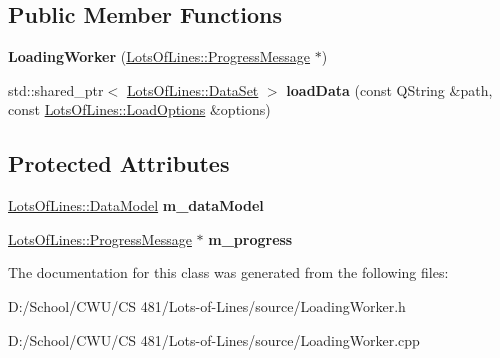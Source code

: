 \subsection*{Public Member Functions}
\begin{DoxyCompactItemize}
\item 
{\bfseries Loading\+Worker} (\hyperlink{class_lots_of_lines_1_1_progress_message}{Lots\+Of\+Lines\+::\+Progress\+Message} $\ast$)\hypertarget{class_loading_worker_a3f5b1820e6770cc3d981360d730cd7dc}{}\label{class_loading_worker_a3f5b1820e6770cc3d981360d730cd7dc}

\item 
std\+::shared\+\_\+ptr$<$ \hyperlink{class_lots_of_lines_1_1_data_set}{Lots\+Of\+Lines\+::\+Data\+Set} $>$ {\bfseries load\+Data} (const Q\+String \&path, const \hyperlink{struct_lots_of_lines_1_1_load_options}{Lots\+Of\+Lines\+::\+Load\+Options} \&options)\hypertarget{class_loading_worker_abbabae8666e6f2f8cd5ec90d172b414b}{}\label{class_loading_worker_abbabae8666e6f2f8cd5ec90d172b414b}

\end{DoxyCompactItemize}
\subsection*{Protected Attributes}
\begin{DoxyCompactItemize}
\item 
\hyperlink{class_lots_of_lines_1_1_data_model}{Lots\+Of\+Lines\+::\+Data\+Model} {\bfseries m\+\_\+data\+Model}\hypertarget{class_loading_worker_a1688b4d70f0007faafdb59b3f9ba79b6}{}\label{class_loading_worker_a1688b4d70f0007faafdb59b3f9ba79b6}

\item 
\hyperlink{class_lots_of_lines_1_1_progress_message}{Lots\+Of\+Lines\+::\+Progress\+Message} $\ast$ {\bfseries m\+\_\+progress}\hypertarget{class_loading_worker_a2f4ce82052cbcc0ba982e8ff6d2cd709}{}\label{class_loading_worker_a2f4ce82052cbcc0ba982e8ff6d2cd709}

\end{DoxyCompactItemize}


The documentation for this class was generated from the following files\+:\begin{DoxyCompactItemize}
\item 
D\+:/\+School/\+C\+W\+U/\+C\+S 481/\+Lots-\/of-\/\+Lines/source/Loading\+Worker.\+h\item 
D\+:/\+School/\+C\+W\+U/\+C\+S 481/\+Lots-\/of-\/\+Lines/source/Loading\+Worker.\+cpp\end{DoxyCompactItemize}
